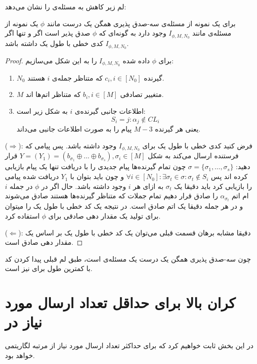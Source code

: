 لم زیر کاهش به مسئله‌ی
\picod
را نشان می‌دهد:
\begin{lemma}
	برای یک نمونه از مسئله‌ی سه-صدق پذیری همگن یک درست مانند
	$\phi$
	یک نمونه از مسئله‌ی
	\picod
	مانند
	$I_{\phi, M, N_0}$
	وجود دارد به گونه‌ای که 
	$\phi$
	صدق پذیر است اگر و تنها اگر 
	$I_{\phi, M, N_0}$
	کدی خطی با طول یک داشته باشد.
\end{lemma}
\begin{proof}
	برای
	$\phi$
	داده شده
		$I_{\phi, M, N_0}$
		را به این شکل می‌سازیم:
		\begin{enumerate}
			\item
			$N_0$
			گیرنده
			$c_i, i \in [N_0]$
			که متناظر جمله‌ی
			$i$
			هستند.
			\item
			$M$
			متغییر تصادفی
			$b_i, i \in [M]$
			 که متناظر اتم‌ها اند.
			 \item 
			 اطلاعات جانبی گیرنده‌ی
			 $i$
			 به شکل زیر است:
			 $$S_i = {j: \alpha_j \notin CL_i}$$
			 یعنی هر گیرنده
			 $M - 3$
			 پیام را به صورت اطلاعات جانبی می‌داند.
		\end{enumerate}
		($\Rightarrow$):
		فرض کنید کدی خطی با طول یک برای
			$I_{\phi, M, N_0}$
			وجود داشته باشد. پس پیامی که فرستنده ارسال می‌کند به شکل
			$Y = (Y_1) = (b_{\sigma_1} \oplus \ldots \oplus b_{\sigma_s}), \sigma_i \in [M]$
			قرار دهید: 
			$\sigma = \{ \sigma_1, \ldots, \sigma_s \}$
			چون تمام گیرنده‌ها پیام جدیدی را با دریافت تنها یک پیام بازیابی کرده اند پس
			$\forall i \in [N_0]: \exists \sigma_t \in \sigma: \sigma_t \notin S_i$
			و چون باید بتوان با 
			$Y_1$
			دریافت شده پیامی را بازیابی کرد باید دقیقا یک
			$\sigma_t$
			به ازای هر
			$i$
			وجود داشته باشد. حال اگر در
			$\phi$
			در جمله
			$i$
			ام اتم
			$\alpha_{\sigma_t}$
			را صادق قرار دهیم تمام جملات که متناظر گیرنده‌ها هستند صادق می‌شوند و در هر جمله دقیقا یک اتم صادق است. در نتیجه یک کد خطی با طول یک را میتوان برای تولید یک مقدار دهی صادقی برای
			$\phi$
			استفاده کرد.
			
			($\Leftarrow$):
			دقیقا مشابه برهان قسمت قبلی می‌توان یک کد خطی با طول یک بر اساس یک مقدار دهی صادق است.
\end{proof}
چون سه-صدق پذیری همگن یک درست یک مسئله‌ی
\nphard
است، طبق لم قبلی پیدا کردن کد با کمترین طول برای
\lpicod
نیز
\nphard
است.
\section{
کران بالا برای حداقل تعداد ارسال مورد نیاز در
\picod
}
در این بخش ثابت خواهیم کرد که برای
\picodt
حداکثر تعداد ارسال مورد نیاز از مرتبه لگاریتمی خواهد بود.

